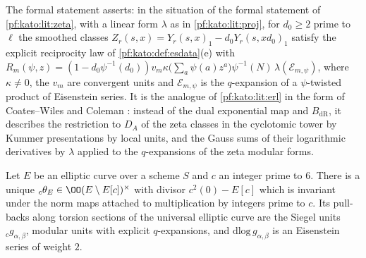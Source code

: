 \begin{remark}\label{pf:kato:rem:erl}
The formal statement asserts: in the situation of the formal statement of \cref{pf:kato:lit:zeta}, with a linear form $\lambda$ as in
\cref{pf:kato:lit:proj}, for $d_0\ge2$ prime to $\ell$ the smoothed classes $Z_r(s,x)=Y_r(s,x)_1-d_0Y_r(s,xd_0)_1$ satisfy the explicit
reciprocity law of \cref{pf:kato:def:esdata}(e) with
$R_m(\psi,z)=(1-d_0\psi^{-1}(d_0))v_m\kappa\bigl(\sum_a\psi(a)z^a\bigr)\psi^{-1}(N)\,\lambda(\mathcal E_{m,\psi})$, where $\kappa\ne0$, the $v_m$ are
convergent units and $\mathcal E_{m,\psi}$ is the $q$-expansion of a $\psi$-twisted product of Eisenstein series. It is the analogue of
\cref{pf:kato:lit:erl} in the form of Coates--Wiles and Coleman \cite{CoatesWiles1977,Coleman1979}: instead of the dual exponential
map and $B_{\mathrm{dR}}$, it describes the restriction to $D_A$ of the zeta classes in the cyclotomic tower by Kummer presentations
by local units, and the Gauss sums of their logarithmic derivatives by $\lambda$ applied to the $q$-expansions of the zeta modular forms.
\end{remark}

\begin{littheorem}\label{pf:kato:lit:siegel}
Let $E$ be an elliptic curve over a scheme $S$ and $c$ an integer prime to $6$. There is a unique ${}_c\theta_E\in\OO(E\setminus E[c])^\times$
with divisor $c^2(0)-E[c]$ which is invariant under the norm maps attached to multiplication by integers prime to $c$. Its pull-backs
along torsion sections of the universal elliptic curve are the Siegel units ${}_cg_{\alpha,\beta}$, modular units with explicit
$q$-expansions, and $\mathrm{dlog}\,g_{\alpha,\beta}$ is an Eisenstein series of weight $2$.
\end{littheorem}

